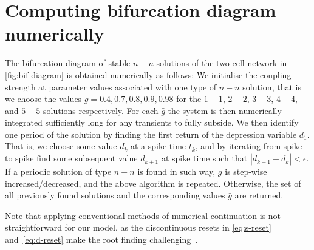 \documentclass[utf8]{frontiers_suppmat} %
\begin{document}
\section{Computing bifurcation diagram numerically}\label{appendix2}
The bifurcation diagram of stable $n-n$ solutions of the two-cell network in \cref{fig:bif-diagram} is obtained numerically as follows:
We initialise the coupling strength at parameter values associated with one type of $n-n$ solution, that is we choose the values $\bar g = 0.4, 0.7, 0.8, 0.9, 0.98$ for the $1-1$, $2-2$, $3-3$, $4-4$, and $5-5$ solutions respectively.
For each $\bar g$ the system is then numerically integrated sufficiently long for any transients to fully subside.
We then identify one period of the solution by finding the first return of the depression variable $d_{1}$.
That is, we choose some value $d_{k}$ at a spike time $t_{k}$, and by iterating from spike to spike find some subsequent value $d_{k+1}$ at spike time such that $|d_{k+1}-d_{k}|<\epsilon$.
If a periodic solution of type $n-n$ is found in such way, $\bar g$ is step-wise increased/decreased, and the above algorithm is repeated.
Otherwise, the set of all previously found solutions and the corresponding values $\bar g$ are returned.

Note that applying conventional methods of numerical continuation is not straightforward for our model, as the discontinuous resets in \cref{eq:s-reset} and~\eqref{eq:d-reset} make the root finding challenging~\citep[e.g. see][ for continuation methods]{kuznetsov2004}.




\end{document}
